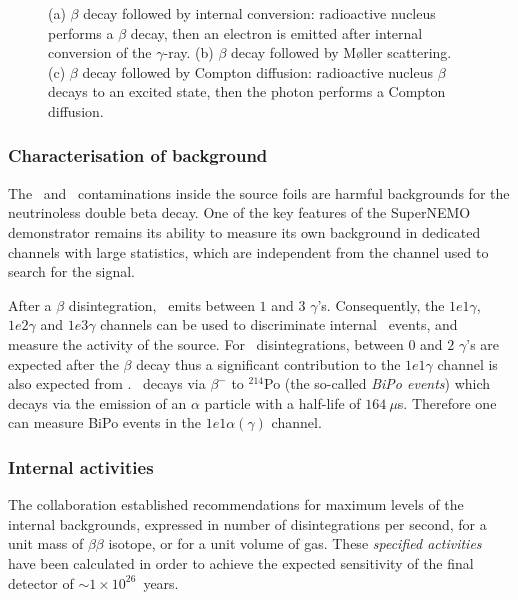 \begin{figure}[!h]
\begin{subfigure}[t]{0.32\textwidth}
  \captionsetup{justification=justified}
  \caption{
    \label{subfig:int_cont_compton}}
\end{subfigure}
\caption{(a) $\beta$ decay followed by internal conversion: radioactive nucleus performs a $\beta$ decay, then an electron is emitted after internal conversion of the $\gamma$-ray.
    (b) $\beta$ decay followed by M\o{}ller scattering.
    (c) $\beta$ decay followed by Compton diffusion: radioactive nucleus $\beta$ decays to an excited state, then the photon performs a Compton diffusion.
  \label{fig:internal_contamination}}
\end{figure}

\subsubsection*{Characterisation of background}

The \Tl\ and \Bi\ contaminations inside the source foils are harmful backgrounds for the neutrinoless double beta decay.
One of the key features of the SuperNEMO demonstrator remains its ability to measure its own background in dedicated channels with large statistics, which are independent from the channel used to search for the signal.

After a $\beta$ disintegration, \Tl\ emits between $1$ and $3$ $\gamma$'s.
Consequently, the $1e1\gamma$, $1e2\gamma$ and $1e3\gamma$ channels can be used to discriminate internal \Tl\ events, and measure the activity of the source.
For \Bi\ disintegrations, between $0$ and $2$ $\gamma$'s are expected after the $\beta$ decay thus a significant contribution to the $1e1\gamma$ channel is also expected from \Bi.
\Bi\ decays via $\beta^{-}$ to $^{214}$Po (the so-called \emph{BiPo events}) which decays via the emission of an $\alpha$ particle with a half-life of $164~\mu$s.
Therefore one can measure BiPo events in the $1e1\alpha(\gamma)$ channel.

\subsubsection*{Internal activities}

The collaboration established recommendations for maximum levels of the internal backgrounds, expressed in number of disintegrations per second, for a unit mass of $\beta\beta$ isotope, or for a unit volume of gas.
These \emph{specified activities} have been calculated in order to achieve the expected sensitivity of the final detector of $\sim 1\times 10^{26}$~years.

